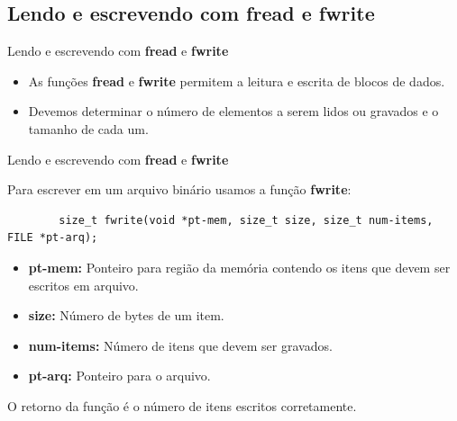 \documentclass[handout]{beamer}
\begin{document}
\subsection{Lendo e escrevendo com fread e fwrite}

\begin{frame}[fragile]{Lendo e escrevendo com \textbf{fread} e \textbf{fwrite}}

    \begin{itemize}
        \item As funções \textbf{fread} e \textbf{fwrite} permitem a leitura
        e escrita de blocos de dados.
        \item Devemos determinar o número de elementos a serem lidos ou
        gravados e o tamanho de cada um.
    \end{itemize}

\end{frame}

\begin{frame}[fragile]{Lendo e escrevendo com \textbf{fread} e \textbf{fwrite}}

    Para escrever em um arquivo binário usamos a função \textbf{fwrite}:
    \begin{verbatim}
        size_t fwrite(void *pt-mem, size_t size, size_t num-items, FILE *pt-arq);
    \end{verbatim}

    \begin{itemize}
        \item \textbf{pt-mem:} Ponteiro para região da memória contendo
        os itens que devem ser escritos em arquivo.
        \item \textbf{size:} Número de bytes de um item.
        \item \textbf{num-items:} Número de itens que devem ser gravados.
        \item \textbf{pt-arq:} Ponteiro para o arquivo.
    \end{itemize}

    O retorno da função é o número de itens escritos corretamente.

\end{frame}
\end{document}
